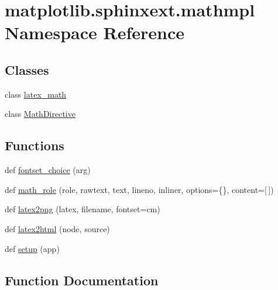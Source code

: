 \hypertarget{namespacematplotlib_1_1sphinxext_1_1mathmpl}{}\section{matplotlib.\+sphinxext.\+mathmpl Namespace Reference}
\label{namespacematplotlib_1_1sphinxext_1_1mathmpl}
\subsection*{Classes}
\begin{DoxyCompactItemize}
\item 
class \hyperlink{classmatplotlib_1_1sphinxext_1_1mathmpl_1_1latex__math}{latex\+\_\+math}
\item 
class \hyperlink{classmatplotlib_1_1sphinxext_1_1mathmpl_1_1MathDirective}{Math\+Directive}
\end{DoxyCompactItemize}
\subsection*{Functions}
\begin{DoxyCompactItemize}
\item 
def \hyperlink{namespacematplotlib_1_1sphinxext_1_1mathmpl_a9c07ce9d0f2375aea2299100d44ac4d6}{fontset\+\_\+choice} (arg)
\item 
def \hyperlink{namespacematplotlib_1_1sphinxext_1_1mathmpl_a17ba71d48a8389bf30b7eeec50e8648f}{math\+\_\+role} (role, rawtext, text, lineno, inliner, options=\{\}, content=\mbox{[}$\,$\mbox{]})
\item 
def \hyperlink{namespacematplotlib_1_1sphinxext_1_1mathmpl_a5dd71e3e051c13abe58c56f041e3f5be}{latex2png} (latex, filename, fontset=\textquotesingle{}cm\textquotesingle{})
\item 
def \hyperlink{namespacematplotlib_1_1sphinxext_1_1mathmpl_a3524613a2ab8b0effc795d00fdbb79f0}{latex2html} (node, source)
\item 
def \hyperlink{namespacematplotlib_1_1sphinxext_1_1mathmpl_afc5cd8c75a8882d903df47b0845bbdcc}{setup} (app)
\end{DoxyCompactItemize}


\subsection{Function Documentation}
\mbox{\label{namespacematplotlib_1_1sphinxext_1_1mathmpl_a9c07ce9d0f2375aea2299100d44ac4d6}} 

